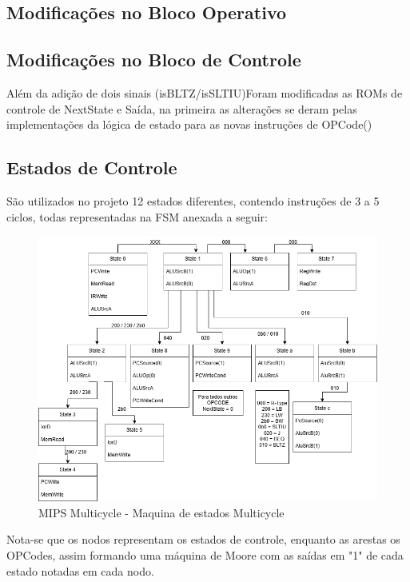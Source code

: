 \documentclass{report}
\begin{document}
        \subsection{Modificações no Bloco Operativo}

        \subsection{Modificações no Bloco de Controle}
        Além da adição de dois sinais (isBLTZ/isSLTIU)Foram modificadas as ROMs de controle de NextState e Saída, na primeira as alterações se deram pelas implementações da lógica de estado para as novas instruções de OPCode()
        
        \subsection{Estados de Controle}
        São utilizados no projeto 12 estados diferentes, contendo instruções de 3 a 5 ciclos, todas representadas na FSM anexada a seguir:
        \begin{figure}[h!]
            \centering
            \includegraphics[width=\linewidth]{images/prints/Multicycle/FSM Multicycle.png}
            \caption{\label{print:FSM_Multicycle} MIPS Multicycle - Maquina de estados Multicycle}
        \end{figure}
        Nota-se que os nodos representam os estados de controle, enquanto as arestas os OPCodes, assim formando uma máquina de Moore com as saídas em "1" de cada estado notadas em cada nodo.
\end{document}
